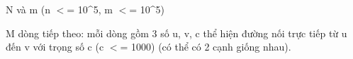 N và m (n $<$= 10\textasciicircum5, m $<$= 10\textasciicircum5)

M dòng tiếp theo: mỗi dòng gồm 3 số u, v, c thể hiện đường nối trực tiếp từ u đến v với trọng số c (c $<$= 1000) (có thể có 2 cạnh giống nhau).